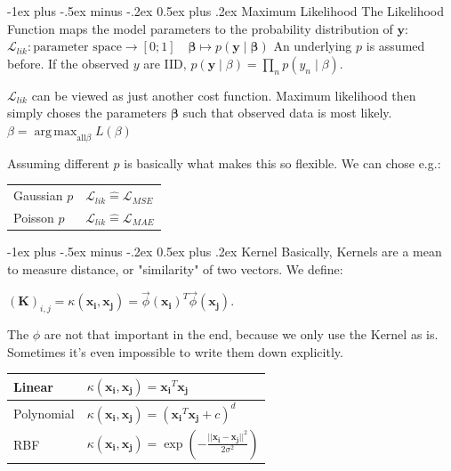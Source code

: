 \documentclass[10pt,a4paper,landscape]{article}
\makeatletter
\renewcommand{\section}{\@startsection{section}{1}{0mm}%
                                {-1ex plus -.5ex minus -.2ex}%
                                {0.5ex plus .2ex}%
                                {\color{darkred}\normalfont\large\bfseries}}
\DeclareMathOperator*{\argmax}{arg\,max}
\makeatother
\begin{document}
\begin{multicols*}{4}
\section{Maximum Likelihood}
The Likelihood Function maps the model parameters to the probability distribution of $\mathbf{y}$: 
$\mathcal{L}_{lik}\colon \text{parameter space} \to [0;1]\quad  \mathbf{\beta} \mapsto p(\mathbf{y} \mid  \mathbf{\beta})$
An underlying $p$ is assumed before. If the observed $y$ are IID, $p(\mathbf{y} \mid \beta) = \prod_n p(y_n \mid \beta)$.

$\mathcal{L}_{lik}$ can be viewed as just another cost function. Maximum likelihood then simply choses the parameters $\mathbf{\beta}$ such that observed data is most likely. $\beta = \argmax_{\text{all} \beta} L(\beta)$

Assuming different $p$ is basically what makes this so flexible. We can chose e.g.:

\begin{tabular}{ l  l } 
  \hline  
   Gaussian $p$ & $\mathcal{L}_{lik} \widehat{=} \mathcal{L}_{MSE}$ \\                  
  Poisson $p$ & $\mathcal{L}_{lik} \widehat{=} \mathcal{L}_{MAE}$ \\
  \hline  
\end{tabular}


\section{Kernel}
Basically, Kernels are a mean to measure distance, or "similarity" of two vectors. We define:

$(\mathbf{K})_{i,j} = \kappa(\mathbf{x_i}, \mathbf{x_j}) = \vec \phi(\mathbf{x_i})^T \vec \phi(\mathbf{x_j})$.

The $\phi$ are not that important in the end, because we only use the Kernel as is. Sometimes it's even impossible to write them down explicitly.

\begin{tabular}{ l | l }
\hline
Linear & $\kappa(\mathbf{x_i}, \mathbf{x_j}) = \mathbf{x_i}^T \mathbf{x_j}$ \\
\hline
Polynomial & $\kappa(\mathbf{x_i}, \mathbf{x_j}) = (\mathbf{x_i}^T \mathbf{x_j} + c)^d$ \\
\hline
RBF & $\kappa(\mathbf{x_i}, \mathbf{x_j}) = \exp\left(-\frac{||\mathbf{x_i} - \mathbf{x_j}||^2}{2\sigma^2}\right)$ \\
\hline
\end{tabular}


\end{multicols*}
\end{document}
